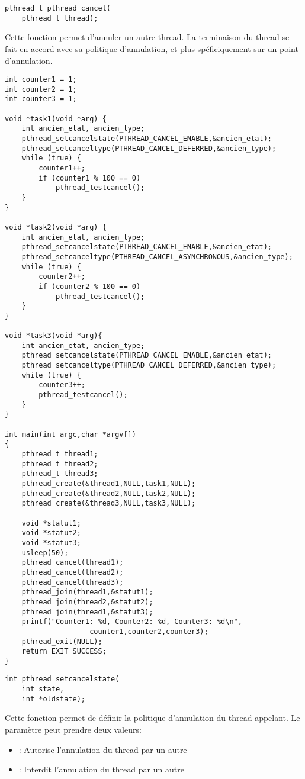 \label{func:pthread_cancel}

\begin{lstlisting}
pthread_t pthread_cancel(
	pthread_t thread);
\end{lstlisting}
Cette fonction permet d'annuler un autre thread. La terminaison du thread se fait en accord avec sa politique d'annulation, et plus spéficiquement sur un point d'annulation.
\begin{lstlisting}[frame=trBL]
int counter1 = 1;
int counter2 = 1;
int counter3 = 1;

void *task1(void *arg) {
	int ancien_etat, ancien_type;
	pthread_setcancelstate(PTHREAD_CANCEL_ENABLE,&ancien_etat);
	pthread_setcanceltype(PTHREAD_CANCEL_DEFERRED,&ancien_type);
	while (true) {
		counter1++;
		if (counter1 % 100 == 0)
			pthread_testcancel();
	}
}

void *task2(void *arg) {
	int ancien_etat, ancien_type;
	pthread_setcancelstate(PTHREAD_CANCEL_ENABLE,&ancien_etat);
	pthread_setcanceltype(PTHREAD_CANCEL_ASYNCHRONOUS,&ancien_type);
	while (true) {
		counter2++;
		if (counter2 % 100 == 0)
			pthread_testcancel();
	}
}

void *task3(void *arg){
	int ancien_etat, ancien_type;
	pthread_setcancelstate(PTHREAD_CANCEL_ENABLE,&ancien_etat);
	pthread_setcanceltype(PTHREAD_CANCEL_DEFERRED,&ancien_type);
	while (true) {
		counter3++;
		pthread_testcancel();
	}
}

int main(int argc,char *argv[])
{
	pthread_t thread1;
	pthread_t thread2;
	pthread_t thread3;
	pthread_create(&thread1,NULL,task1,NULL);
	pthread_create(&thread2,NULL,task2,NULL);
	pthread_create(&thread3,NULL,task3,NULL);

	void *statut1;
	void *statut2;
	void *statut3;
	usleep(50);
	pthread_cancel(thread1);
	pthread_cancel(thread2);
	pthread_cancel(thread3);
	pthread_join(thread1,&statut1);
	pthread_join(thread2,&statut2);
	pthread_join(thread1,&statut3);
	printf("Counter1: %d, Counter2: %d, Counter3: %d\n",
					counter1,counter2,counter3);
	pthread_exit(NULL);
	return EXIT_SUCCESS;
}
\end{lstlisting}


\label{func:pthread_setcancelstate}

\begin{lstlisting}
int pthread_setcancelstate(
	int state,
	int *oldstate);
\end{lstlisting}
Cette fonction permet de définir la politique d'annulation du thread appelant. Le paramètre  peut prendre deux valeurs:
\begin{itemize}
	\item {}: Autorise l'annulation du thread par un autre
	\item {}: Interdit l'annulation du thread par un autre
\end{itemize}

